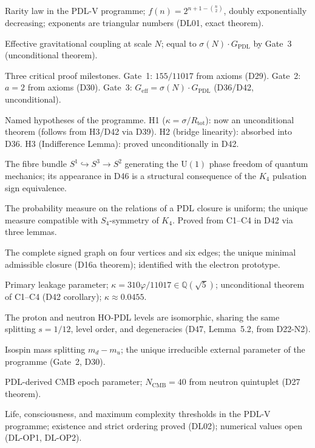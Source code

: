 \documentclass[11pt,a4paper]{article}
\theoremstyle{plain}
\theoremstyle{definition}
\theoremstyle{remark}
\newcommand{\Geff}{G_{\mathrm{eff}}}
\newcommand{\GPDL}{G_{\mathrm{PDL}}}
\newcommand{\sigmaN}{\sigma(N)}
\begin{document}
\begin{description}[leftmargin=3.5cm, style=nextline]
\item[$f(n)$] Rarity law in the PDL-V programme; $f(n) = 2^{n+1-\binom{n}{2}}$, doubly exponentially decreasing; exponents are triangular numbers (DL01, exact theorem).
\item[$\Geff(N)$] Effective gravitational coupling at scale $N$; equal to $\sigmaN\cdot\GPDL$ by Gate~3 (unconditional theorem).
\item[Gate 1, 2, 3] Three critical proof milestones. Gate~1: $155/11017$ from axioms (D29). Gate~2: $a=2$ from axioms (D30). Gate~3: $\Geff=\sigmaN\cdot\GPDL$ (D36/D42, unconditional).
\item[H1, H2, H3] Named hypotheses of the programme. H1 ($\kappa=\sigma/R_{\mathrm{tot}}$): now an unconditional theorem (follows from H3/D42 via D39). H2 (bridge linearity): absorbed into D36. H3 (Indifference Lemma): proved unconditionally in D42.
\item[Hopf fibration] The fibre bundle $S^1\hookrightarrow S^3\to S^2$ generating the $\mathrm{U}(1)$ phase freedom of quantum mechanics; its appearance in D46 is a structural consequence of the $K_4$ pulsation sign equivalence.
\item[Indifference Lemma (H3)] The probability measure on the relations of a PDL closure is uniform; the unique measure compatible with $S_4$-symmetry of $K_4$. Proved from C1--C4 in D42 via three lemmas.
\item[$K_4$] The complete signed graph on four vertices and six edges; the unique minimal admissible closure (D16a theorem); identified with the electron prototype.
\item[$\kappa$] Primary leakage parameter; $\kappa=310\varphi/11017\in\mathbb{Q}(\sqrt{5})$; unconditional theorem of C1--C4 (D42 corollary); $\kappa\approx 0.0455$.
\item[Mirror Lemma] The proton and neutron HO-PDL levels are isomorphic, sharing the same splitting $s=1/12$, level order, and degeneracies (D47, Lemma~5.2, from D22-N2).
\item[$m_{\mathrm{iso}}$] Isospin mass splitting $m_d-m_u$; the unique irreducible external parameter of the programme (Gate~2, D30).
\item[$N_{\mathrm{CMB}}$] PDL-derived CMB epoch parameter; $N_{\mathrm{CMB}}=40$ from neutron quintuplet (D27 theorem).
\item[$n^*_{\mathrm{life}}$, $n^*_{\mathrm{consciousness}}$, $n^*_{\mathrm{max}}$] Life, consciousness, and maximum complexity thresholds in the PDL-V programme; existence and strict ordering proved (DL02); numerical values open (DL-OP1, DL-OP2).

\end{description}
\end{document}
